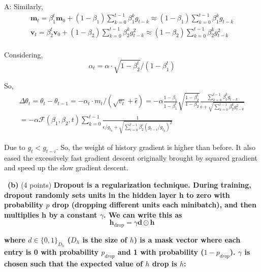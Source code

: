 \documentclass[a4 paper]{article}
\newcommand{\subproblem}[1]{~\newline\textbf{(#1)}}
\begin{document}
A: Similarly,
\begin{equation}
    \begin{aligned}
    \mathbf{m}_t
    = \beta_{1}^t \mathbf{m}_{0} + (1-\beta_{1})\sum_{k=0}^{t-1}\beta_{1}^k g_{t-k} 
    \approx (1-\beta_{1})\sum_{k=0}^{t-1}\beta_{1}^k g_{t-k} \\
    \mathbf{v}_t
    = \beta_{2}^t \mathbf{v}_{0} + (1-\beta_{2})\sum_{k=0}^{t-1}\beta_{2}^k g_{t-k}^2 
    \approx (1-\beta_{2})\sum_{k=0}^{t-1}\beta_{2}^k g_{t-k}^2 \\
    \end{aligned}
    \label{eq:momentum}
\end{equation}

Considering,
\begin{equation}
    \alpha_{t}=\alpha \cdot \sqrt{1-\beta_{2}^{t}} /\left(1-\beta_{1}^{t}\right)
\end{equation}

So,
\begin{equation}
    \begin{aligned}
    \Delta \theta_{t} = \theta_{t} - \theta_{t-1}
    = -\alpha_{t} \cdot m_{t} /(\sqrt{v_{t}}+\hat{\epsilon})
    = -\alpha \frac{1-\beta_1}{1-\beta_1^t} \sqrt{\frac{1-\beta_2^t}{1-\beta_2}}\frac{\sum_{k=0}^{t-1}\beta_{1}^k g_{t-k}}{\epsilon + \sqrt{\sum_{k=0}^{t-1}\beta_{2}^k g_{t-k}^2}} \\
    = -\alpha \mathcal{F}(\beta_1, \beta_2, t) \sum_{k=0}^{t-1} \frac{1}{\epsilon/g_{t_k} + \sqrt{\sum_{i=0}^{t-1}\beta_{2}^i (g_{t-i}/g_{t_k})^2}}
    \end{aligned}
\end{equation}

Due to $g_t < g_{t-i}$. So, the weight of history gradient is higher than before.
It also eased the excessively fast gradient descent originally brought by squared gradient and speed up the slow gradient descent.

\subproblem{b} (4 points) \textbf{Dropout is a regularization technique.
During training, dropout randomly sets units in the hidden layer h to zero with probability $p$ drop (dropping diﬀerent units each minibatch), and then multiplies h by a constant $\gamma$.
We can write this as}
\begin{equation}
    \mathbf{h}_{\mathrm{drop}}=\gamma \mathbf{d} \odot \mathbf{h}
\end{equation}

\textbf{where $d\in\{0,1\}_{D_h}$ ($D_h$ is the size of $h$) is a mask vector where each entry is 0 with probability $p_{drop}$ and 1 with probability ($1-p_{drop}$).
$\gamma$ is chosen such that the expected value of $h$ drop is $h$:}
\end{document}
